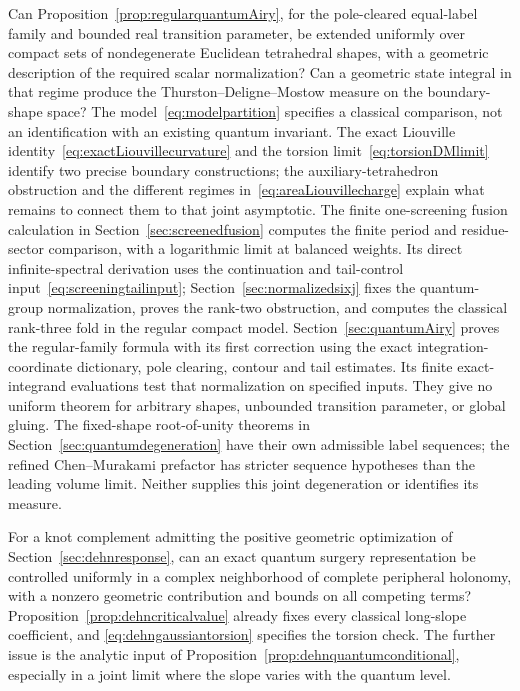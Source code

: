 \begin{question}
Can Proposition~\ref{prop:regularquantumAiry}, for the pole-cleared
equal-label family and bounded real transition parameter, be extended
uniformly over compact sets of nondegenerate Euclidean tetrahedral
shapes, with a geometric description of the required scalar normalization?
Can a geometric state
integral in that regime produce the Thurston--Deligne--Mostow measure
on the boundary-shape space? The model~\eqref{eq:modelpartition}
specifies a classical comparison, not an identification with an
existing quantum invariant. The exact Liouville
identity~\eqref{eq:exactLiouvillecurvature} and the torsion
limit~\eqref{eq:torsionDMlimit} identify two precise boundary
constructions; the auxiliary-tetrahedron obstruction and the
different regimes in~\eqref{eq:areaLiouvillecharge} explain
what remains to connect them to that joint asymptotic.
The finite one-screening fusion calculation in
Section~\ref{sec:screenedfusion} computes the finite period and
residue-sector comparison, with a logarithmic limit at balanced
weights. Its direct infinite-spectral derivation uses the
continuation and tail-control input~\eqref{eq:screeningtailinput};
Section~\ref{sec:normalizedsixj} fixes the quantum-group
normalization, proves the rank-two obstruction, and computes
the classical rank-three fold in the regular compact model.
Section~\ref{sec:quantumAiry} proves the regular-family formula with
its first correction using the exact integration-coordinate dictionary,
pole clearing, contour and tail estimates. Its finite exact-integrand
evaluations test that normalization on specified inputs. They give no
uniform theorem for arbitrary shapes, unbounded transition parameter,
or global gluing. The fixed-shape root-of-unity theorems in
Section~\ref{sec:quantumdegeneration} have their own admissible label
sequences; the refined Chen--Murakami prefactor has stricter sequence
hypotheses than the leading volume limit. Neither supplies this joint
degeneration or identifies its measure.
\end{question}

\begin{question}
For a knot complement admitting the positive geometric optimization
of Section~\ref{sec:dehnresponse}, can an exact quantum surgery
representation be controlled uniformly in a complex neighborhood
of complete peripheral holonomy, with a nonzero geometric contribution
and bounds on all competing terms? Proposition~\ref{prop:dehncriticalvalue}
already fixes every classical long-slope coefficient, and
\eqref{eq:dehngaussiantorsion} specifies the torsion check. The further
issue is the analytic input of
Proposition~\ref{prop:dehnquantumconditional}, especially in a joint
limit where the slope varies with the quantum level.
\end{question}


